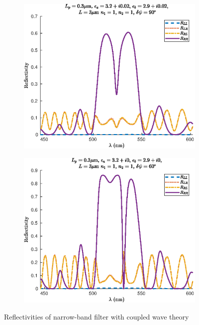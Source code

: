 \begin{figure}
\begin{subfigure}{0.49\linewidth}
	\end{subfigure}
	\begin{subfigure}{0.49\linewidth}
		\includegraphics[width=\linewidth]{plots/defect/reflectivity_losses/cwt_reflection}
		\caption{}
	\end{subfigure}
	\begin{subfigure}{0.49\linewidth}
		\includegraphics[width=\linewidth]{plots/defect/reflectivity_other_defect/cwt_reflection}
		\caption{}
	\end{subfigure}
	\caption[Reflectivity of the narrow-band filter]{Reflectivities of narrow-band filter with coupled wave theory}
	\label{fig:reflectivities_narrow_appendix}
\end{figure}

